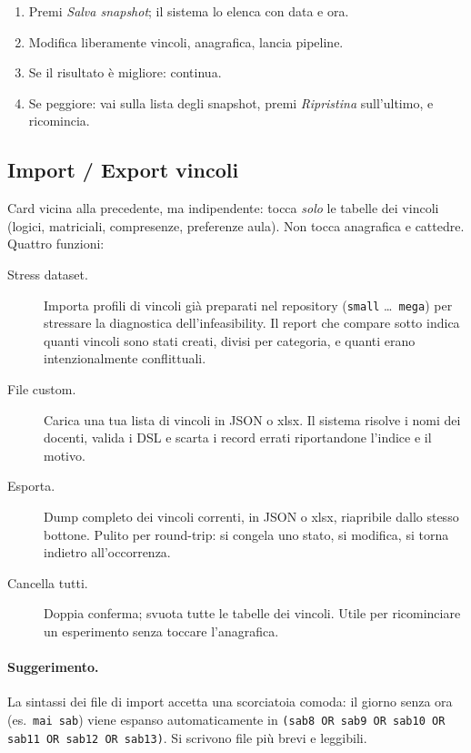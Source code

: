 \begin{esempiobox}[title=Workflow rapido con snapshot]
\begin{enumerate}
\item Premi \emph{Salva snapshot}; il sistema lo elenca con
  data e ora.
\item Modifica liberamente vincoli, anagrafica, lancia
  pipeline.
\item Se il risultato \`e migliore: continua.
\item Se peggiore: vai sulla lista degli snapshot, premi
  \emph{Ripristina} sull'ultimo, e ricomincia.
\end{enumerate}
\end{esempiobox}

\subsection{Import / Export vincoli}

Card vicina alla precedente, ma indipendente: tocca \emph{solo}
le tabelle dei vincoli (logici, matriciali, compresenze,
preferenze aula). Non tocca anagrafica e cattedre. Quattro
funzioni:

\begin{description}
\item[Stress dataset.] Importa profili di vincoli gi\`a
  preparati nel repository (\texttt{small} \dots\ \texttt{mega})
  per stressare la diagnostica dell'infeasibility. Il report
  che compare sotto indica quanti vincoli sono stati creati,
  divisi per categoria, e quanti erano intenzionalmente
  conflittuali.
\item[File custom.] Carica una tua lista di vincoli in JSON o
  xlsx. Il sistema risolve i nomi dei docenti, valida i DSL e
  scarta i record errati riportandone l'indice e il motivo.
\item[Esporta.] Dump completo dei vincoli correnti, in JSON o
  xlsx, riapribile dallo stesso bottone. Pulito per
  round-trip: si congela uno stato, si modifica, si torna
  indietro all'occorrenza.
\item[Cancella tutti.] Doppia conferma; svuota tutte le tabelle
  dei vincoli. Utile per ricominciare un esperimento senza
  toccare l'anagrafica.
\end{description}

\paragraph{Suggerimento.} La sintassi dei file di import accetta
una scorciatoia comoda: il giorno senza ora
(es.\ \texttt{mai sab}) viene espanso automaticamente in
\texttt{(sab8 OR sab9 OR sab10 OR sab11 OR sab12 OR sab13)}. Si
scrivono file pi\`u brevi e leggibili.

